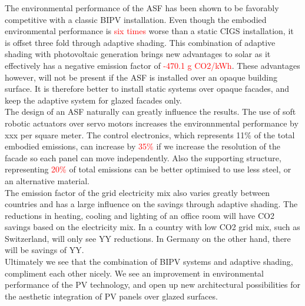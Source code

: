 
The environmental performance of the ASF has been shown to be favorably competitive with a classic BIPV installation. Even though the embodied environmental performance is \textcolor{red}{six times} worse than a static CIGS installation, it is offset three fold through adaptive shading. This combination of adaptive shading with photovoltaic generation brings new advantages to solar as it effectively has a negative emission factor of \textcolor{red}{-470.1 g CO2/kWh}. These advantages however, will not be present if the ASF is installed over an opaque building surface. It is therefore better to install static systems over opaque facades, and keep the adaptive system for glazed facades only. \\
The design of an ASF naturally can greatly influence the results. The use of soft robotic actuators over servo motors increases the environnmental performance by xxx per square meter. The control electronics, which represents 11\% of the total embodied emissions, can increase by \textcolor{red}{35\%} if we increase the resolution of the facade so each panel can move independently. Also the supporting structure, representing \textcolor{red}{20\%} of total emissions can be better optimised to use less steel, or an alternative material. \\
The emission factor of the grid electricity mix also varies greatly between countries and has a large influence on the savings through adaptive shading. The reductions in heating, cooling and lighting of an office room will have CO2 savings based on the electricity mix. In a country with low CO2 grid mix, such as Switzerland, will only see YY reductions. In Germany on the other hand, there will be savings of YY.\\
Ultimately we see that the combination of BIPV systems and adaptive shading, compliment each other nicely. We see an improvement in environmental performance of the PV technology, and open up new architectural possibilities for the aesthetic integration of PV panels over glazed surfaces.


